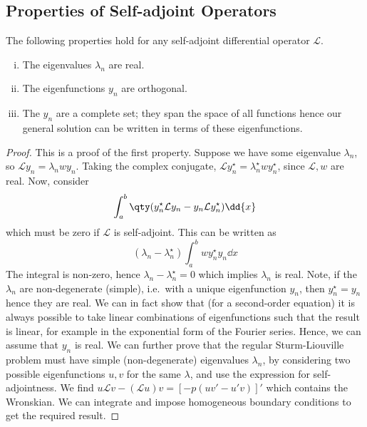 \subsection{Properties of Self-adjoint Operators}
The following properties hold for any self-adjoint differential operator \( \mathcal L \).
\begin{enumerate}[(i)]
    \item The eigenvalues \( \lambda_n \) are real.
    \item The eigenfunctions \( y_n \) are orthogonal.
    \item The \( y_n \) are a complete set; they span the space of all functions hence our general solution can be written in terms of these eigenfunctions.
\end{enumerate}
\begin{proof}
    This is a proof of the first property.
    Suppose we have some eigenvalue \( \lambda_n \), so \( \mathcal L y_n = \lambda_n w y_n \).
    Taking the complex conjugate, \( \mathcal L y_n^\star = \lambda_n^\star w y_n^\star \), since \( \mathcal L, w \) are real.
    Now, consider
    \[ \int_a^b \qty(y_n^\star \mathcal L y_n - y_n \mathcal L y_n^\star) \dd{x} \]
    which must be zero if \( \mathcal L \) is self-adjoint.
    This can be written as
    \[ (\lambda_n - \lambda_n^\star) \int_a^b w y_n^\star y_n \dd{x} \]
    The integral is non-zero, hence \( \lambda_n - \lambda_n^\star = 0 \) which implies \( \lambda_n \) is real.
    Note, if the \( \lambda_n \) are non-degenerate (simple), i.e.\ with a unique eigenfunction \( y_n \), then \( y_n^\star = y_n \) hence they are real.
    We can in fact show that (for a second-order equation) it is always possible to take linear combinations of eigenfunctions such that the result is linear, for example in the exponential form of the Fourier series.
    Hence, we can assume that \( y_n \) is real.
    We can further prove that the regular Sturm-Liouville problem must have simple (non-degenerate) eigenvalues \( \lambda_n \), by considering two possible eigenfunctions \( u, v \) for the same \( \lambda \), and use the expression for self-adjointness.
    We find \( u \mathcal L v - (\mathcal L u) v = [-p(uv' - u'v)]' \) which contains the Wronskian.
    We can integrate and impose homogeneous boundary conditions to get the required result.
\end{proof}
